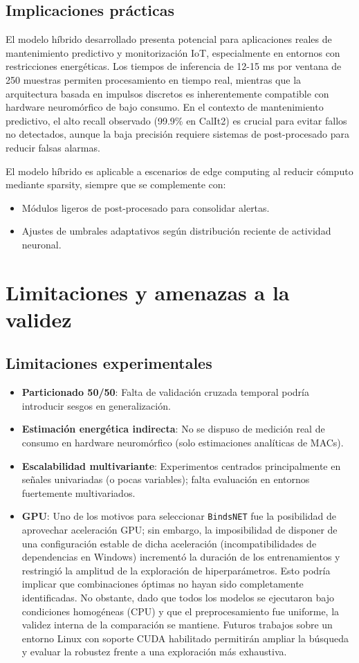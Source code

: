 \subsection{Implicaciones prácticas}
El modelo híbrido desarrollado presenta potencial para aplicaciones reales de mantenimiento predictivo y monitorización IoT, especialmente en entornos con restricciones energéticas. Los tiempos de inferencia de 12-15 ms por ventana de 250 muestras permiten procesamiento en tiempo real, mientras que la arquitectura basada en impulsos discretos es inherentemente compatible con hardware neuromórfico de bajo consumo. En el contexto de mantenimiento predictivo, el alto recall observado (99.9\% en CalIt2) es crucial para evitar fallos no detectados, aunque la baja precisión requiere sistemas de post-procesado para reducir falsas alarmas.

El modelo híbrido es aplicable a escenarios de edge computing al reducir cómputo mediante sparsity, siempre que se complemente con:
\begin{itemize}
    \item Módulos ligeros de post-procesado para consolidar alertas.
    \item Ajustes de umbrales adaptativos según distribución reciente de actividad neuronal.
\end{itemize}

\section{Limitaciones y amenazas a la validez}
\subsection{Limitaciones experimentales}
\begin{itemize}
    \item \textbf{Particionado 50/50}: Falta de validación cruzada temporal podría introducir sesgos en generalización.
    \item \textbf{Estimación energética indirecta}: No se dispuso de medición real de consumo en hardware neuromórfico (solo estimaciones analíticas de MACs).
    \item \textbf{Escalabilidad multivariante}: Experimentos centrados principalmente en señales univariadas (o pocas variables); falta evaluación en entornos fuertemente multivariados.
    \item \textbf{GPU}: Uno de los motivos para seleccionar \texttt{BindsNET} fue la posibilidad de aprovechar aceleración GPU; sin embargo, la imposibilidad de disponer de una configuración estable de dicha aceleración (incompatibilidades de dependencias en Windows) incrementó la duración de los entrenamientos y restringió la amplitud de la exploración de hiperparámetros. Esto podría implicar que combinaciones óptimas no hayan sido completamente identificadas. No obstante, dado que todos los modelos se ejecutaron bajo condiciones homogéneas (CPU) y que el preprocesamiento fue uniforme, la validez interna de la comparación se mantiene. Futuros trabajos sobre un entorno Linux con soporte CUDA habilitado permitirán ampliar la búsqueda y evaluar la robustez frente a una exploración más exhaustiva.
\end{itemize}

